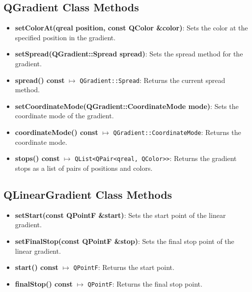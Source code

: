 \documentclass{report}
\begin{document}
    \pagebreak 

    \bigbreak \noindent 
    \subsection{QGradient Class Methods}
    \begin{itemize}
        \item \textbf{setColorAt(qreal position, const QColor \&color)}: Sets the color at the specified position in the gradient.
        \item \textbf{setSpread(QGradient::Spread spread)}: Sets the spread method for the gradient.
        \item \textbf{spread() const} $\mapsto$ \texttt{QGradient::Spread}: Returns the current spread method.
        \item \textbf{setCoordinateMode(QGradient::CoordinateMode mode)}: Sets the coordinate mode of the gradient.
        \item \textbf{coordinateMode() const} $\mapsto$ \texttt{QGradient::CoordinateMode}: Returns the coordinate mode.
        \item \textbf{stops() const} $\mapsto$ \texttt{QList<QPair<qreal, QColor>>}: Returns the gradient stops as a list of pairs of positions and colors.
    \end{itemize}

    \bigbreak \noindent 
    \subsection{QLinearGradient Class Methods}
    \begin{itemize}
        \item \textbf{setStart(const QPointF \&start)}: Sets the start point of the linear gradient.
        \item \textbf{setFinalStop(const QPointF \&stop)}: Sets the final stop point of the linear gradient.
        \item \textbf{start() const} $\mapsto$ \texttt{QPointF}: Returns the start point.
        \item \textbf{finalStop() const} $\mapsto$ \texttt{QPointF}: Returns the final stop point.
    \end{itemize}

    \bigbreak \noindent 
\end{document}
